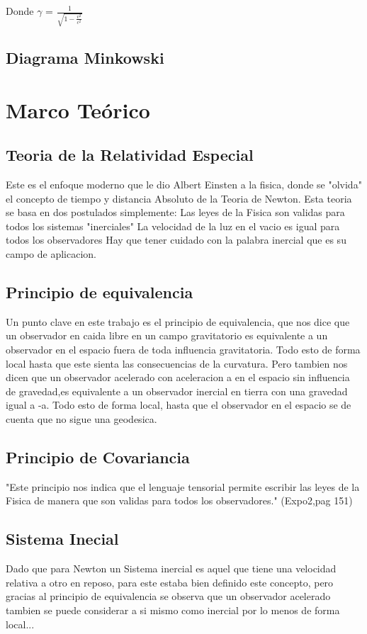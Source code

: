 \documentclass[12pt,twoside]{rif}
\begin{document}
Donde $\gamma$ = $\frac{1}{\sqrt{1-\frac{v^{2}}{c^{2}}}}$
	
	
	\subsection{Diagrama Minkowski}
	
	
	
	\section{Marco Teórico}
	\subsection{Teoria de la Relatividad Especial}
	Este es el enfoque moderno que le dio Albert Einsten a la fisica, donde se "olvida" el concepto de tiempo y distancia Absoluto de la Teoria de Newton.
	Esta teoria se basa en dos postulados simplemente:
	Las leyes de la Fisica son validas para todos los sistemas "inerciales"
	 La velocidad de la luz en el vacio es igual para todos los observadores 
	Hay que tener cuidado con la palabra inercial que es su campo de aplicacion.
	\subsection{Principio de equivalencia}
	Un punto clave en este trabajo es el principio de equivalencia, que nos dice que un observador en caida libre en un campo gravitatorio es equivalente a un observador en el espacio fuera de toda influencia gravitatoria. Todo esto de forma local hasta que este sienta las consecuencias de la curvatura. Pero tambien nos dicen que un observador acelerado con aceleracion a en el espacio sin influencia de gravedad,es equivalente a un observador inercial en tierra con una gravedad igual a -a. Todo esto de forma local, hasta que el observador en el espacio se de cuenta que no sigue una geodesica.
	\subsection{Principio de Covariancia}
	"Este principio nos indica que el lenguaje tensorial permite escribir las leyes de la Fisica de manera que son validas para todos los observadores." (Expo2,pag 151)
	\subsection{Sistema Inecial}
	Dado que para Newton un Sistema inercial es aquel que tiene una velocidad relativa a otro en reposo, para este estaba bien definido este concepto, pero gracias al principio de equivalencia se observa que un observador acelerado tambien se puede considerar a si mismo como inercial por lo menos de forma local...
\end{document}
